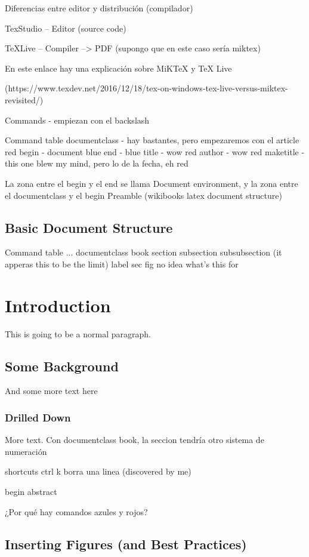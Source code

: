 \documentclass{article}
\begin{document}
	Diferencias entre editor y distribución (compilador)
	
	TexStudio -- Editor (source code)
	
	TeXLive -- Compiler --> PDF (supongo que en este caso sería miktex)
	
	En este enlace hay una explicación sobre MiKTeX y TeX Live
	
	 (https://www.texdev.net/2016/12/18/tex-on-windows-tex-live-versus-miktex-revisited/)
	
	Commands - empiezan con el backslash
	
	Command table documentclass - hay bastantes, pero empezaremos con el article red
	begin - document blue
	end - blue
			title - wow red
			author - wow red
			maketitle - this one blew my mind, pero lo de la fecha, eh red
			
	La zona entre el begin y el end se llama Document environment, y la zona entre el documentclass y el begin Preamble (wikibooks latex document structure)
	
	\subsection{Basic Document Structure}
	
	Command table ...
	documentclass book
	section
	subsection
	subsubsection (it apperas this to be the limit)
	label sec fig no idea what's this for
	
	\section{Introduction}
	This is going to be a normal paragraph.
	\subsection{Some Background}
	And some more text here
	\subsubsection{Drilled Down}\label{sec:drilled-down}
	More text.		
	Con documentclass book, la seccion tendría otro sistema de numeración
	
	shortcuts ctrl k borra una linea (discovered by me)
	
	begin abstract
	
	¿Por qué hay comandos azules y rojos?
	\newpage
	\subsection{Inserting Figures (and Best Practices)}
	
\end{document}
